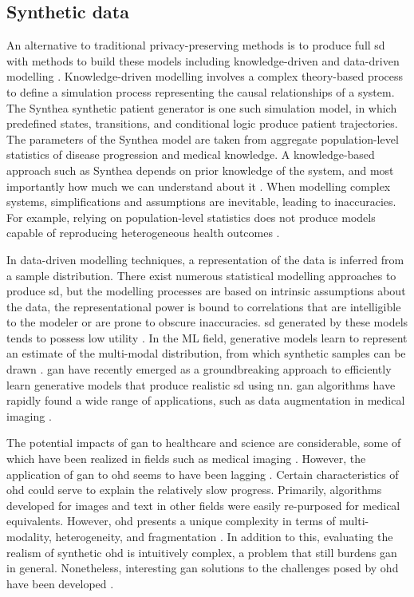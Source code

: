     \subsection{Synthetic data}
        An alternative to traditional privacy-preserving methods is to produce full \gls{sd} with methods to build these models including knowledge-driven and data-driven modelling \cite{Kim_2017}. Knowledge-driven modelling involves a complex theory-based process to define a simulation process representing the causal relationships of a system. The Synthea \cite{Walonoski_2017} synthetic patient generator is one such simulation model, in which predefined states, transitions, and conditional logic produce patient trajectories. The parameters of the Synthea model are taken from aggregate population-level statistics of disease progression and medical knowledge. A knowledge-based approach such as Synthea depends on prior knowledge of the system, and most importantly how much we can understand about it \cite{Kim_2017}. When modelling complex systems, simplifications and assumptions are inevitable, leading to inaccuracies. For example, relying on population-level statistics does not produce models capable of reproducing heterogeneous health outcomes \cite{Chen_2019}.\par
        
        In data-driven modelling techniques, a representation of the data is inferred from a sample distribution. There exist numerous statistical modelling approaches to produce \gls{sd}, but the modelling processes are based on intrinsic assumptions about the data, the representational power is bound to correlations that are intelligible to the modeler or are prone to obscure inaccuracies. \gls{sd} generated by these models tends to possess low utility \cite{Rankin2020}. In the ML field, generative models learn to represent an estimate of the multi-modal distribution, from which synthetic samples can be drawn \cite{goodfellow2016nips}. \Gls{gan} \cite{NIPS2014_5423} have recently emerged as a groundbreaking approach to efficiently learn generative models that produce realistic \gls{sd} using \gls{nn}. \gls{gan} algorithms have rapidly found a wide range of applications, such as data augmentation in medical imaging \cite{Kadurin_2017}.\par
        
        The potential impacts of \gls{gan} to healthcare and science are considerable, some of which have been realized in fields such as medical imaging \cite{Yi_2019}. However, the application of \gls{gan} to \gls{ohd} seems to have been lagging \cite{Xiao_2018_chall}. Certain characteristics of \gls{ohd} could serve to explain the relatively slow progress. Primarily, algorithms developed for images and text in other fields were easily re-purposed for medical equivalents. However, \gls{ohd} presents a unique complexity in terms of multi-modality, heterogeneity, and fragmentation \cite{Xiao_2018_chall}. In addition to this, evaluating the realism of synthetic \gls{ohd} is intuitively complex, a problem that still burdens \gls{gan} in general. Nonetheless, interesting \gls{gan} solutions to the challenges posed by \gls{ohd} have been developed \cite{esteban2017real,Che_2017,Choi2017-nt,yahi2017generative}.